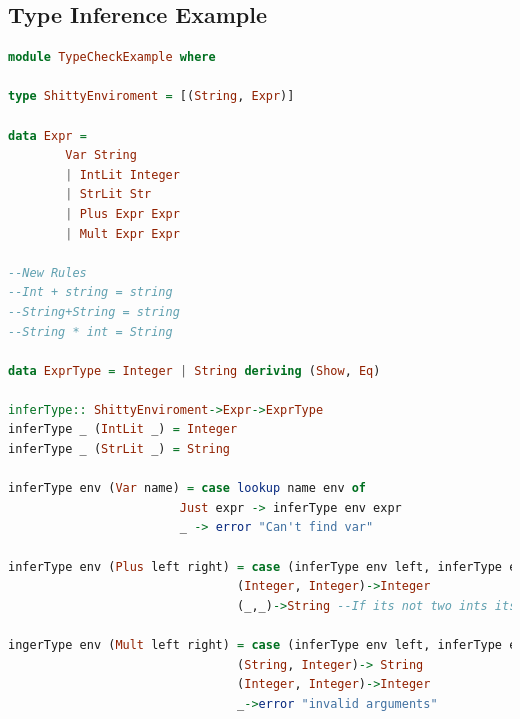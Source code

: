 \documentclass{article}
\begin{document}
    \subsection{Type Inference Example}
    \begin{lstlisting}[language=Haskell]
module TypeCheckExample where

type ShittyEnviroment = [(String, Expr)]

data Expr = 
        Var String
        | IntLit Integer
        | StrLit Str
        | Plus Expr Expr
        | Mult Expr Expr

--New Rules
--Int + string = string
--String+String = string
--String * int = String

data ExprType = Integer | String deriving (Show, Eq)

inferType:: ShittyEnviroment->Expr->ExprType
inferType _ (IntLit _) = Integer
inferType _ (StrLit _) = String

inferType env (Var name) = case lookup name env of
                        Just expr -> inferType env expr
                        _ -> error "Can't find var"

inferType env (Plus left right) = case (inferType env left, inferType env right) of
                                (Integer, Integer)->Integer
                                (_,_)->String --If its not two ints its a string!

ingerType env (Mult left right) = case (inferType env left, inferType env right) of
                                (String, Integer)-> String
                                (Integer, Integer)->Integer
                                _->error "invalid arguments"
    \end{lstlisting}
\end{document}
